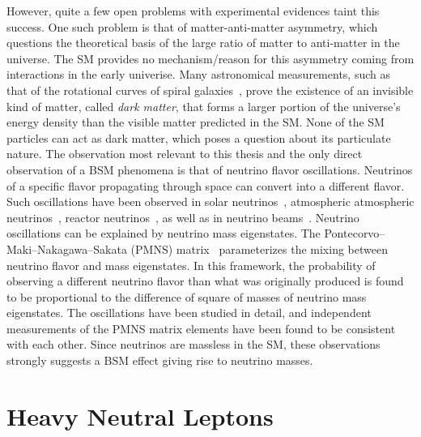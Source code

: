 However, quite a few open problems with experimental evidences taint this success. One such problem is that of matter-anti-matter asymmetry, which questions the theoretical basis of the large ratio of matter to anti-matter in the universe. The SM provides no mechanism/reason for this asymmetry coming from interactions in the early univerise. Many astronomical measurements, such as that of the rotational curves of spiral galaxies~\cite{Begeman:1989kf}, prove the existence of an invisible kind of matter, called \textit{dark matter}, that forms a larger portion of the universe's energy density than the visible matter predicted in the SM. None of the SM particles can act as dark matter, which poses a question about its particulate nature. The observation most relevant to this thesis and the only direct observation of a BSM phenomena is that of neutrino flavor oscillations. Neutrinos of a specific flavor propagating through space can convert into a different flavor. Such oscillations have been observed in solar neutrinos~\cite{PhysRevLett.87.071301}, atmospheric atmospheric neutrinos~\cite{PhysRevLett.81.1562}, reactor neutrinos~\cite{PhysRevLett.108.171803}, as well as in neutrino beams~\cite{PhysRevD.88.032002}. Neutrino oscillations can be explained by neutrino mass eigenstates. The Pontecorvo–Maki–Nakagawa–Sakata (PMNS) matrix~\cite{Maki1962} parameterizes the mixing between neutrino flavor and mass eigenstates. In this framework, the probability of observing a different neutrino flavor than what was originally produced is found to be proportional to the difference of square of masses of neutrino mass eigenstates. The oscillations have been studied in detail, and independent measurements of the PMNS matrix elements have been found to be consistent with each other. Since neutrinos are massless in the SM, these observations strongly suggests a BSM effect giving rise to neutrino masses.

\section{Heavy Neutral Leptons}\label{sec:hnl}


